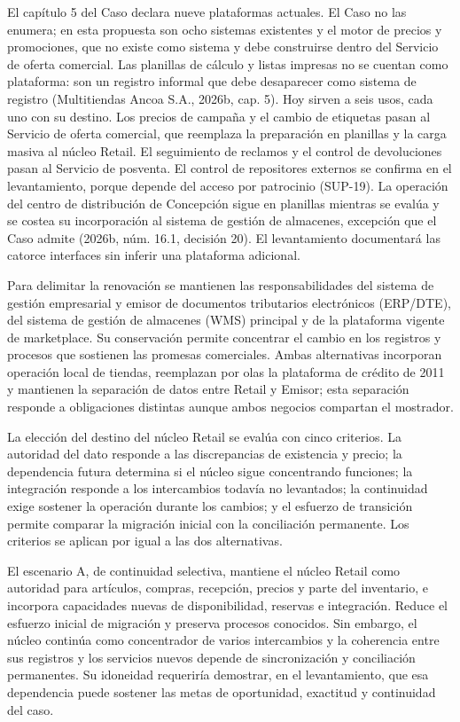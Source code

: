 \documentclass[11pt]{article}
\begin{document}
{El capítulo 5 del Caso declara nueve plataformas actuales. El Caso no las enumera; en esta propuesta son ocho sistemas existentes y el motor de precios y promociones, que no existe como sistema y debe construirse dentro del Servicio de oferta comercial. Las planillas de cálculo y listas impresas no se cuentan como plataforma: son un registro informal que debe desaparecer como sistema de registro (Multitiendas Ancoa S.A., 2026b, cap. 5). Hoy sirven a seis usos, cada uno con su destino. Los precios de campaña y el cambio de etiquetas pasan al Servicio de oferta comercial, que reemplaza la preparación en planillas y la carga masiva al núcleo Retail. El seguimiento de reclamos y el control de devoluciones pasan al Servicio de posventa. El control de repositores externos se confirma en el levantamiento, porque depende del acceso por patrocinio (SUP-19). La operación del centro de distribución de Concepción sigue en planillas mientras se evalúa y se costea su incorporación al sistema de gestión de almacenes, excepción que el Caso admite (2026b, núm. 16.1, decisión 20). El levantamiento documentará las catorce interfaces sin inferir una plataforma adicional.}

{Para delimitar la renovación se mantienen las responsabilidades del sistema de gestión empresarial y emisor de documentos tributarios electrónicos (ERP/DTE), del sistema de gestión de almacenes (WMS) principal y de la plataforma vigente de marketplace. Su conservación permite concentrar el cambio en los registros y procesos que sostienen las promesas comerciales. Ambas alternativas incorporan operación local de tiendas, reemplazan por olas la plataforma de crédito de 2011 y mantienen la separación de datos entre Retail y Emisor; esta separación responde a obligaciones distintas aunque ambos negocios compartan el mostrador.}

{La elección del destino del núcleo Retail se evalúa con cinco criterios. La autoridad del dato responde a las discrepancias de existencia y precio; la dependencia futura determina si el núcleo sigue concentrando funciones; la integración responde a los intercambios todavía no levantados; la continuidad exige sostener la operación durante los cambios; y el esfuerzo de transición permite comparar la migración inicial con la conciliación permanente. Los criterios se aplican por igual a las dos alternativas.}

{El escenario A, de continuidad selectiva, mantiene el núcleo Retail como autoridad para artículos, compras, recepción, precios y parte del inventario, e incorpora capacidades nuevas de disponibilidad, reservas e integración. Reduce el esfuerzo inicial de migración y preserva procesos conocidos. Sin embargo, el núcleo continúa como concentrador de varios intercambios y la coherencia entre sus registros y los servicios nuevos depende de sincronización y conciliación permanentes. Su idoneidad requeriría demostrar, en el levantamiento, que esa dependencia puede sostener las metas de oportunidad, exactitud y continuidad del caso.}
\end{document}
